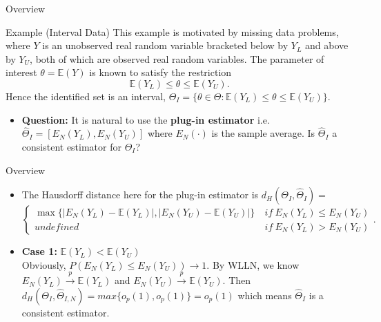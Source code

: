 \documentclass[aspectratio=169]{beamer}  %
\begin{document}
\begin{frame}{Overview}
    \begin{block}{Example (Interval Data)} 
        This example is motivated by missing data problems, where $Y$ is an unobserved real random variable bracketed below by $Y_L$ and above by $Y_U$, both of which are observed real random variables. The parameter of interest $\theta = \mathbb{E}(Y)$ is known to satisfy the restriction $$\mathbb{E}(Y_L) \le \theta \le \mathbb{E}(Y_U).$$
    Hence the identified set is an interval, $\Theta_I = \{\theta\in\Theta:\mathbb{E}(Y_L) \le \theta \le \mathbb{E}(Y_U)\}$.
    \end{block}
    \begin{itemize}
        \item \textbf{Question:} It is natural to use the \textbf{plug-in estimator} i.e.  $\hat{\Theta}_I = [E_N(Y_L),E_N(Y_U)]$ where $E_N(\cdot)$ is the sample average. Is $\hat{\Theta}_I$ a consistent estimator for $\Theta_I$?
    \end{itemize}
\end{frame}

\begin{frame}{Overview}
    \begin{itemize}
        \item The Hausdorff distance here for the plug-in estimator is $d_H(\Theta_I,\hat{\Theta}_{I})=$ $$\begin{cases}\max\{|E_N(Y_L)-\mathbb{E}(Y_L)|,|E_N(Y_U)-\mathbb{E}(Y_U)|\}&~if~E_N(Y_L)\leq E_N(Y_U)\\undefined&~if~E_N(Y_L)>E_N(Y_U)\end{cases}.$$
        
        \item \textbf{Case 1:} $\mathbb{E}(Y_L) < \mathbb{E}(Y_U)$ \\ 
        Obviously, $P(E_N (Y_L) \le E_N (Y_U ))\to1$. By WLLN, we know $E_N(Y_L)\overset{p}\to\mathbb{E}(Y_L)$ and $E_N(Y_U)\overset{p}\to\mathbb{E}(Y_U)$. Then $d_H(\Theta_I,\hat{\Theta}_{I,N})=max\{o_p(1),o_p(1)\}=o_p(1)$ which means $\hat{\Theta}_{I}$ is a consistent estimator.
    \end{itemize}
\end{frame}
\end{document}
